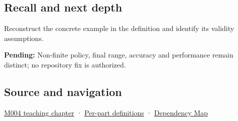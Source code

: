 \subsection{Recall and next depth}\label{appendix-7f1e17dcafb1-recall-and-next-depth}

Reconstruct the concrete example in the definition and identify its validity assumptions.

\textbf{Pending:} Non-finite policy, final range, accuracy and performance remain distinct; no repository fix is authorized.

\subsection{Source and navigation}\label{appendix-7f1e17dcafb1-source-and-navigation}

\hyperref[01-foundations-i-ch001-a-stretching-ruler-for-real-valued-quantities]{M004 teaching chapter} · \hyperref[appendix-fd090d982a15-m004---parts-61-76]{Per-part definitions} · \hyperref[appendix-4ad47bdd269a]{Dependency Map}
